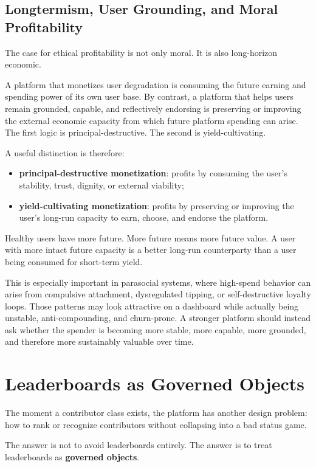 \documentclass[11pt]{article}
\begin{document}
\subsection{Longtermism, User Grounding, and Moral Profitability}

The case for ethical profitability is not only moral. It is also long-horizon economic.

A platform that monetizes user degradation is consuming the future earning and spending power of its own user base. By contrast, a platform that helps users remain grounded, capable, and reflectively endorsing is preserving or improving the external economic capacity from which future platform spending can arise. The first logic is principal-destructive. The second is yield-cultivating.

A useful distinction is therefore:

\begin{itemize}
  \item \textbf{principal-destructive monetization}: profits by consuming the user's stability, trust, dignity, or external viability;
  \item \textbf{yield-cultivating monetization}: profits by preserving or improving the user's long-run capacity to earn, choose, and endorse the platform.
\end{itemize}

Healthy users have more future. More future means more future value. A user with more intact future capacity is a better long-run counterparty than a user being consumed for short-term yield.

This is especially important in parasocial systems, where high-spend behavior can arise from compulsive attachment, dysregulated tipping, or self-destructive loyalty loops. Those patterns may look attractive on a dashboard while actually being unstable, anti-compounding, and churn-prone. A stronger platform should instead ask whether the spender is becoming more stable, more capable, more grounded, and therefore more sustainably valuable over time.

\section{Leaderboards as Governed Objects}

The moment a contributor class exists, the platform has another design problem: how to rank or recognize contributors without collapsing into a bad status game.

The answer is not to avoid leaderboards entirely. The answer is to treat leaderboards as \textbf{governed objects}.
\end{document}
